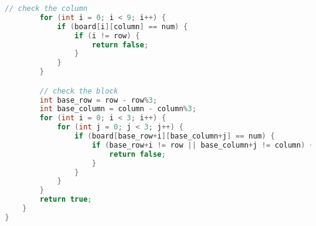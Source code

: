 \documentclass[
  spanish,
  a4paper,
,tablecaptionabove
]{scrartcl}
\begin{document}
\begin{lstlisting}[language=Java, basicstyle=\tiny]
        // check the column
        for (int i = 0; i < 9; i++) {
            if (board[i][column] == num) {
                if (i != row) {
                    return false;
                }
            }
        }

        // check the block
        int base_row = row - row%3;
        int base_column = column - column%3;
        for (int i = 0; i < 3; i++) {
            for (int j = 0; j < 3; j++) {
                if (board[base_row+i][base_column+j] == num) {
                    if (base_row+i != row || base_column+j != column) {
                        return false;
                    }
                }
            }
        }
        return true;
    }
}
\end{lstlisting}
\end{document}
